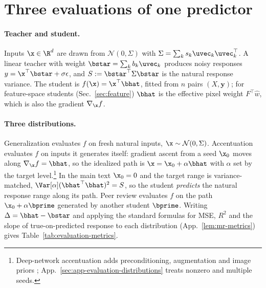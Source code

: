 \section{Three evaluations of one predictor}
\label{sec:setup}

\paragraph{Teacher and student.}
Inputs $\x\in\R^d$ are drawn from $\mathcal N(0,\Sigma)$ with $\Sigma=\sum_ks_k\uvec_k\uvec_k^\top$. A linear teacher with weight $\bstar=\sum_kb_k\uvec_k$ produces noisy responses $y=\x^\top\bstar+\sigma\epsilon$, and $S:={\bstar}^\top\Sigma\bstar$ is the natural response variance. The student is $f(\x)=\x^\top\bhat$, fitted from $n$ pairs $(X,\mathbf y)$; for feature-space students (Sec.~\ref{sec:feature}) $\bhat$ is the effective pixel weight $F^\top\hat w$, which is also the gradient $\nabla_\x f$.

\paragraph{Three distributions.}
Generalization evaluates $f$ on fresh natural inputs, $\x\sim\mathcal N(0,\Sigma)$. Accentuation evaluates $f$ on inputs it generates itself: gradient ascent from a seed $\x_0$ moves along $\nabla_\x f=\bhat$, so the idealized path is $\x=\x_0+\alpha\bhat$ with $\alpha$ set by the target level.\footnote{Deep-network accentuation adds preconditioning, augmentation and image priors \citep{hamblin2024feature}; App.~\ref{sec:app-evaluation-distributions} treats nonzero and multiple seeds.} In the main text $\x_0=0$ and the target range is variance-matched, $\Var[\alpha]({\bhat}^\top\bhat)^2=S$, so the student \emph{predicts} the natural response range along its path. Peer review evaluates $f$ on the path $\x_0+\alpha\bprime$ generated by another student $\bprime$. Writing $\Delta=\bhat-\bstar$ and applying the standard formulas for MSE, $R^2$ and the slope of true-on-predicted response to each distribution (App.~\ref{lem:mr-metrics}) gives Table~\ref{tab:evaluation-metrics}.

